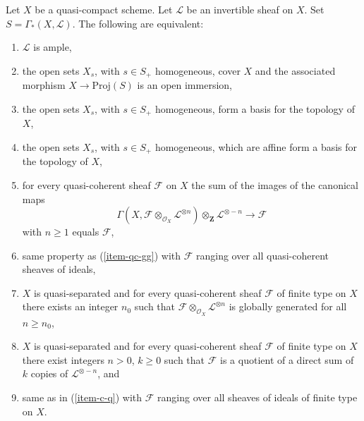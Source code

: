 \begin{proposition}
\label{proposition-characterize-ample}
Let $X$ be a quasi-compact scheme.
Let $\mathcal{L}$ be an invertible sheaf on $X$.
Set $S = \Gamma_*(X, \mathcal{L})$.
The following are equivalent:
\begin{enumerate}
\item
\label{item-ample}
$\mathcal{L}$ is ample,
\item
\label{item-immersion}
the open sets $X_s$, with $s \in S_{+}$ homogeneous,
cover $X$ and the associated morphism $X \to \text{Proj}(S)$
is an open immersion,
\item
\label{item-s-basis}
the open sets $X_s$, with $s \in S_{+}$ homogeneous,
form a basis for the topology of $X$,
\item
\label{item-s-affine-basis}
the open sets $X_s$, with $s \in S_{+}$ homogeneous,
which are affine form a basis for the topology of $X$,
\item
\label{item-qc-gg}
for every quasi-coherent sheaf $\mathcal{F}$ on $X$
the sum of the images of the canonical maps
$$
\Gamma(X, \mathcal{F} \otimes_{\mathcal{O}_X} \mathcal{L}^{\otimes n})
\otimes_{\mathbf{Z}} \mathcal{L}^{\otimes -n}
\longrightarrow
\mathcal{F}
$$
with $n \geq 1$ equals $\mathcal{F}$,
\item
\label{item-qc-i-gg}
same property as (\ref{item-qc-gg}) with $\mathcal{F}$
ranging over all quasi-coherent sheaves of ideals,
\item
\label{item-c-gg}
$X$ is quasi-separated and
for every quasi-coherent sheaf $\mathcal{F}$ of finite type on $X$
there exists an integer $n_0$ such that
$\mathcal{F} \otimes_{\mathcal{O}_X} \mathcal{L}^{\otimes n}$
is globally generated for all $n \geq n_0$,
\item
\label{item-c-q}
$X$ is quasi-separated and
for every quasi-coherent sheaf $\mathcal{F}$ of finite type on $X$
there exist integers $n > 0$, $k \geq 0$ such that
$\mathcal{F}$ is a quotient of a direct sum of $k$ copies of
$\mathcal{L}^{\otimes - n}$, and
\item
\label{item-c-i-q}
same as in (\ref{item-c-q}) with $\mathcal{F}$ ranging over all
sheaves of ideals of finite type on $X$.
\end{enumerate}
\end{proposition}

